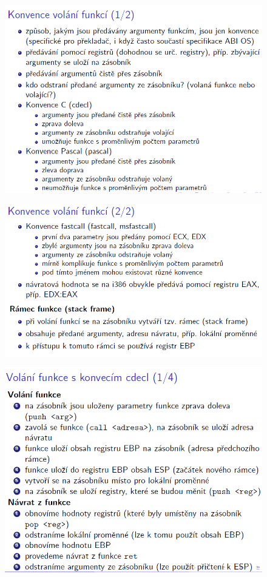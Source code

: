 \documentclass[10pt,a4paper]{article}
\begin{document}
\begin{figure} [h]
	\includegraphics[scale=0.65]{img/prvni_odstavec/otazka5/podprogramy2.png}	
\end{figure}

\begin{figure} [h]
	\includegraphics[scale=0.65]{img/prvni_odstavec/otazka5/podprogramy3.png}	
\end{figure}

\begin{figure} [h]
	\includegraphics[scale=0.65]{img/prvni_odstavec/otazka5/podprogramy4.png}	
\end{figure}
\end{document}
